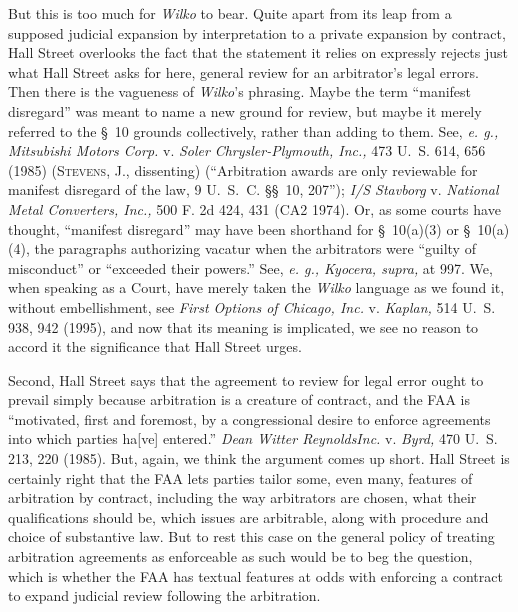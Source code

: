   But this is too much for \emph{Wilko} to bear. Quite apart from its
leap from a supposed judicial expansion by interpretation to a private
expansion by contract, Hall Street overlooks the fact that the statement
it relies on expressly rejects just what Hall Street asks for here,
general review for an arbitrator's legal errors. Then there is
the vagueness of \emph{Wilko}'s phrasing. Maybe the term ``manifest
disregard'' was meant to name a new ground for review, but maybe
it merely referred to the \S~10 grounds collectively, rather than
adding to them. See, \emph{e. g., Mitsubishi Motors Corp.} v. \emph{Soler}
\emph{Chrysler-Plymouth, Inc.,} 473 U.~S. 614, 656 (1985) (\textsc{Stevens,}
J., dissenting) (``Arbitration awards are only reviewable for manifest
disregard of the law, 9 U.~S.~C. \S\S~10, 207''); \emph{I/S Stavborg}
v. \emph{National Metal Converters, Inc.,} 500 F. 2d 424, 431 (CA2 1974).
Or, as some courts have thought, ``manifest disregard'' may have been
shorthand for \S~10(a)(3) or \S~10(a)(4), the paragraphs authorizing
vacatur when the arbitrators were ``guilty of misconduct'' or
``exceeded their powers.'' See, \emph{e. g., Kyocera, supra,} at 997.
We, when speaking as a Court, have merely taken the \emph{Wilko} language
as we found it, without embellishment, see \emph{First Options of Chicago,
Inc.} v. \emph{Kaplan,} 514 U.~S. 938, 942 (1995), and now that its
meaning is implicated, we see no reason to accord it the significance
that Hall Street urges.

  Second, Hall Street says that the agreement to review for legal error
ought to prevail simply because arbitration is a creature of contract,
and the FAA is ``motivated, first and foremost, by a congressional
desire to enforce agreements into which parties ha[ve] entered.''
\emph{Dean Witter Reynolds\newpage Inc.} v. \emph{Byrd,} 470 U.~S. 213, 220
(1985). But, again, we think the argument comes up short. Hall Street
is certainly right that the FAA lets parties tailor some, even many,
features of arbitration by contract, including the way arbitrators
are chosen, what their qualifications should be, which issues are
arbitrable, along with procedure and choice of substantive law. But to
rest this case on the general policy of treating arbitration agreements
as enforceable as such would be to beg the question, which is whether
the FAA has textual features at odds with enforcing a contract to expand
judicial review following the arbitration.

